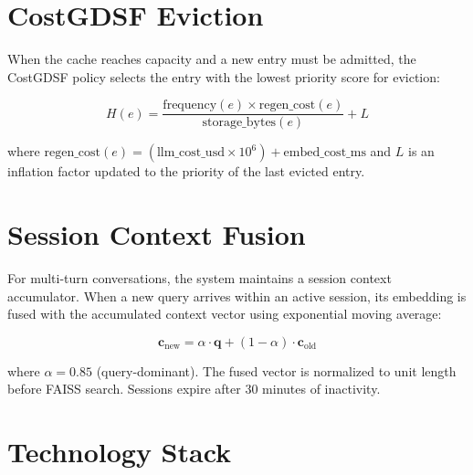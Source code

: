 \documentclass[12pt,a4paper]{report}
\begin{document}
\section{CostGDSF Eviction}

When the cache reaches capacity and a new entry must be admitted, the CostGDSF policy selects the entry with the lowest priority score for eviction:

\begin{equation}
H(e) = \frac{\text{frequency}(e) \times \text{regen\_cost}(e)}{\text{storage\_bytes}(e)} + L
\end{equation}

where $\text{regen\_cost}(e) = (\text{llm\_cost\_usd} \times 10^6) + \text{embed\_cost\_ms}$ and $L$ is an inflation factor updated to the priority of the last evicted entry.

\section{Session Context Fusion}

For multi-turn conversations, the system maintains a session context accumulator. When a new query arrives within an active session, its embedding is fused with the accumulated context vector using exponential moving average:

\begin{equation}
\mathbf{c}_{\text{new}} = \alpha \cdot \mathbf{q} + (1 - \alpha) \cdot \mathbf{c}_{\text{old}}
\end{equation}

where $\alpha = 0.85$ (query-dominant). The fused vector is normalized to unit length before FAISS search. Sessions expire after 30 minutes of inactivity.

\section{Technology Stack}
\end{document}
